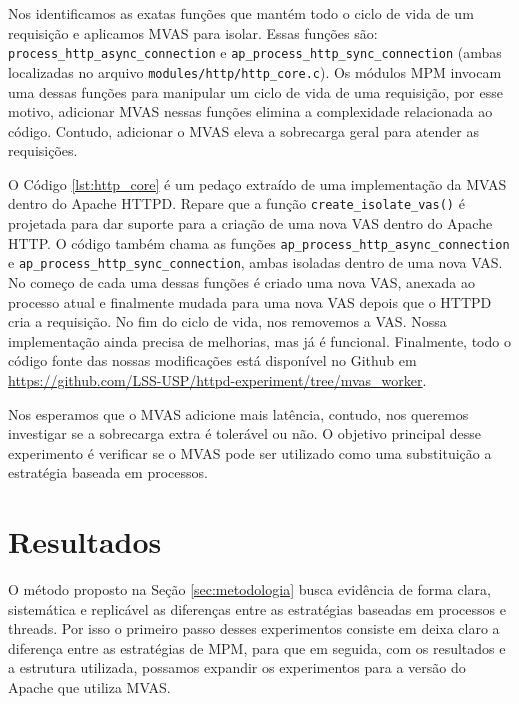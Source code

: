Nos identificamos as exatas funções que mantém todo o ciclo de vida de um
requisição e aplicamos MVAS para isolar. Essas funções são:
\texttt{process\_http\_async\_connection} e
\texttt{ap\_process\_http\_sync\_connection} (ambas localizadas no arquivo
\texttt{modules/http/http\_core.c}). Os módulos MPM invocam uma dessas funções
para manipular um ciclo de vida de uma requisição, por esse motivo, adicionar
MVAS nessas funções elimina a complexidade relacionada ao código. Contudo,
adicionar o MVAS eleva a sobrecarga geral para atender as requisições.

O Código \ref{lst:http_core} é um pedaço extraído de uma implementação da MVAS
dentro do Apache HTTPD. Repare que a função \texttt{create\_isolate\_vas()} é
projetada para dar suporte para a criação de uma nova VAS dentro do Apache
HTTP. O código também chama as funções
\texttt{ap\_process\_http\_async\_connection} e
\texttt{ap\_process\_http\_sync\_connection}, ambas isoladas dentro de uma nova
VAS. No começo de cada uma dessas funções é criado uma nova VAS, anexada ao
processo atual e finalmente mudada para uma nova VAS depois que o HTTPD cria a
requisição. No fim do ciclo de vida, nos removemos a VAS. Nossa implementação
ainda precisa de melhorias, mas já é funcional. Finalmente, todo o código fonte
das nossas modificações está disponível no Github em
\url{https://github.com/LSS-USP/httpd-experiment/tree/mvas\_worker}.



Nos esperamos que o MVAS adicione mais latência, contudo, nos queremos
investigar se a sobrecarga extra é tolerável ou não. O objetivo principal desse
experimento é verificar se o MVAS pode ser utilizado como uma substituição a
estratégia baseada em processos.

\section{Resultados} \label{sec:preliminary}

O método proposto na Seção \ref{sec:metodologia} busca evidência de forma
clara, sistemática e replicável as diferenças entre as estratégias baseadas em
processos e threads. Por isso o primeiro passo desses experimentos consiste em
deixa claro a diferença entre as estratégias de MPM, para que em seguida, com
os resultados e a estrutura utilizada, possamos expandir os experimentos para a
versão do Apache que utiliza MVAS.

